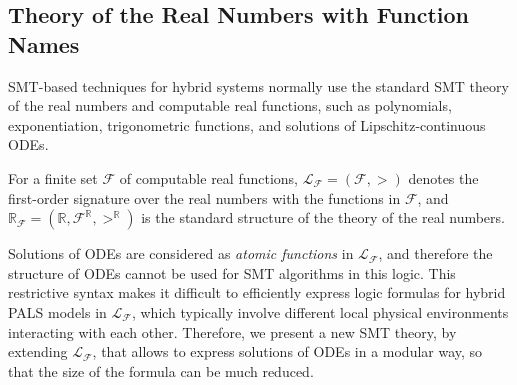 %
%
%
%


\subsection{Theory of the Real Numbers with Function Names}

SMT-based techniques for hybrid systems
normally use the standard SMT theory of the real numbers and computable %
real functions,
such as polynomials, exponentiation, trigonometric functions,  
and solutions of Lipschitz-continuous ODEs.

\begin{definition}
For a finite set $\mathcal{F}$ of computable real functions,
%
$\mathcal{L}_\mathcal{F} = (\mathcal{F}, >)$ denotes the first-order signature over the real numbers
with the functions in $\mathcal{F}$,
and $\mathbb{R}_\mathcal{F} = (\mathbb{R}, \mathcal{F}^\mathbb{R}, >^\mathbb{R})$
is the standard structure of the theory of the real numbers.
\end{definition}


Solutions of ODEs are considered as \emph{atomic functions} in $\mathcal{L}_\mathcal{F}$,
and therefore the structure of ODEs cannot be used for SMT algorithms  in this logic.
This restrictive syntax makes it difficult to efficiently express logic formulas for hybrid PALS models 
in $\mathcal{L}_\mathcal{F}$, which typically involve different local physical environments 
interacting with each other.
Therefore, we present a new SMT theory,
by extending $\mathcal{L}_\mathcal{F}$, that allows to express solutions of ODEs in a modular way,
so that the size of the formula can be much reduced.


